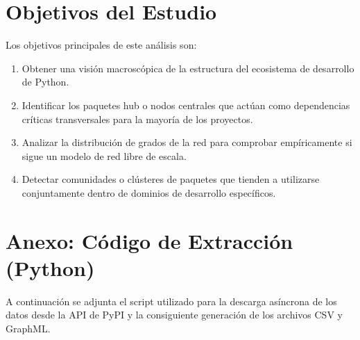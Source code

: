 \documentclass[12pt,a4paper]{article}
\begin{document}
	\section{Objetivos del Estudio}
	Los objetivos principales de este análisis son:
	\begin{enumerate}
		\item Obtener una visión macroscópica de la estructura del ecosistema de desarrollo de Python.
		\item Identificar los paquetes hub o nodos centrales que actúan como dependencias críticas transversales para la mayoría de los proyectos.
		\item Analizar la distribución de grados de la red para comprobar empíricamente si sigue un modelo de red libre de escala.
		\item Detectar comunidades o clústeres de paquetes que tienden a utilizarse conjuntamente dentro de dominios de desarrollo específicos.
	\end{enumerate}
	
	\newpage
	\appendix
	\section{Anexo: Código de Extracción (Python)}
	A continuación se adjunta el script utilizado para la descarga asíncrona de los datos desde la API de PyPI y la consiguiente generación de los archivos CSV y GraphML.
	
\end{document}
